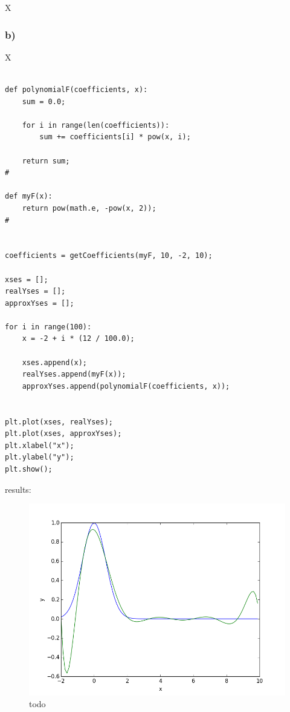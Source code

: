 X



\subsubsection{b)}

X

\begin{lstlisting}[caption=todo]

def polynomialF(coefficients, x):
	sum = 0.0;
	
	for i in range(len(coefficients)):
		sum += coefficients[i] * pow(x, i);
	
	return sum;
#

def myF(x):
	return pow(math.e, -pow(x, 2));
#


coefficients = getCoefficients(myF, 10, -2, 10);

xses = [];
realYses = [];
approxYses = [];

for i in range(100):
	x = -2 + i * (12 / 100.0);
	
	xses.append(x);
	realYses.append(myF(x));
	approxYses.append(polynomialF(coefficients, x));


plt.plot(xses, realYses);
plt.plot(xses, approxYses);
plt.xlabel("x");
plt.ylabel("y");
plt.show();
\end{lstlisting}


results:

\begin{figure}[!ht]
\includegraphics[width=1\textwidth]{chapters/images/figure-5-9-b}
\caption{todo}
\end{figure}


